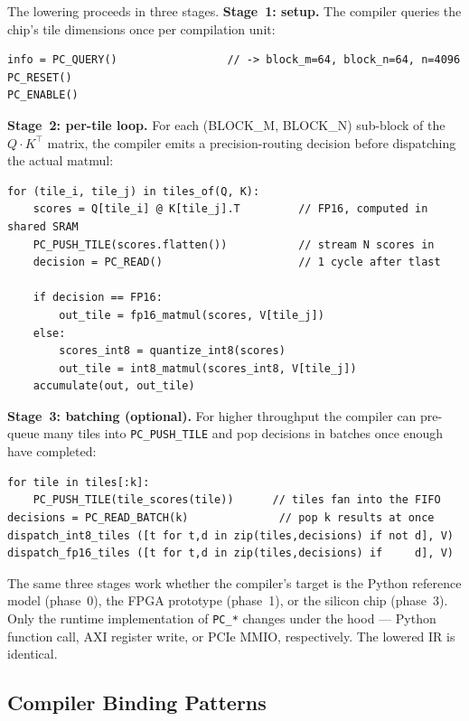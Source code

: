 \documentclass[11pt]{article}
\begin{document}
The lowering proceeds in three stages. \textbf{Stage~1: setup.} The compiler
queries the chip's tile dimensions once per compilation unit:

\begin{lstlisting}[basicstyle=\ttfamily\small]
info = PC_QUERY()                 // -> block_m=64, block_n=64, n=4096
PC_RESET()
PC_ENABLE()
\end{lstlisting}

\textbf{Stage~2: per-tile loop.} For each (BLOCK\_M, BLOCK\_N) sub-block of
the $Q \!\cdot\! K^{\top}$ matrix, the compiler emits a precision-routing
decision before dispatching the actual matmul:

\begin{lstlisting}[basicstyle=\ttfamily\small]
for (tile_i, tile_j) in tiles_of(Q, K):
    scores = Q[tile_i] @ K[tile_j].T         // FP16, computed in shared SRAM
    PC_PUSH_TILE(scores.flatten())           // stream N scores in
    decision = PC_READ()                     // 1 cycle after tlast

    if decision == FP16:
        out_tile = fp16_matmul(scores, V[tile_j])
    else:
        scores_int8 = quantize_int8(scores)
        out_tile = int8_matmul(scores_int8, V[tile_j])
    accumulate(out, out_tile)
\end{lstlisting}

\textbf{Stage~3: batching (optional).} For higher throughput the compiler
can pre-queue many tiles into \texttt{PC\_PUSH\_TILE} and pop decisions
in batches once enough have completed:

\begin{lstlisting}[basicstyle=\ttfamily\small]
for tile in tiles[:k]:
    PC_PUSH_TILE(tile_scores(tile))      // tiles fan into the FIFO
decisions = PC_READ_BATCH(k)              // pop k results at once
dispatch_int8_tiles ([t for t,d in zip(tiles,decisions) if not d], V)
dispatch_fp16_tiles ([t for t,d in zip(tiles,decisions) if     d], V)
\end{lstlisting}

\noindent
The same three stages work whether the compiler's target is the Python
reference model (phase~0), the FPGA prototype (phase~1), or the silicon
chip (phase~3). Only the runtime implementation of \texttt{PC\_*} changes
under the hood --- Python function call, AXI register write, or PCIe MMIO,
respectively. The lowered IR is identical.

\subsection{Compiler Binding Patterns}
\label{sec:bindings}
\end{document}
